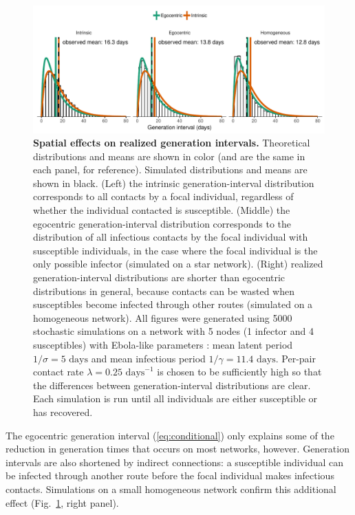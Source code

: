 \documentclass[12pt]{article}
\newcommand{\eref}[1]{(\ref{eq:#1})}
\newcommand{\fref}[1]{Fig.~\ref{fig:#1}}
\begin{document}
\begin{figure}[!pbth]
\includegraphics[width=\textwidth]{../fig/local_effect.pdf}
\caption{
\textbf{Spatial effects on realized generation intervals.}
Theoretical distributions and means are shown in color (and are the same in each panel, for reference). Simulated distributions and means are shown in black.
(Left) the intrinsic generation-interval distribution corresponds to all contacts by a focal individual, regardless of whether the individual contacted is susceptible.
(Middle) the egocentric generation-interval distribution corresponds to the distribution of all infectious contacts by the focal individual with susceptible individuals, in the case where the focal individual is the only possible infector (simulated on a star network).
(Right) realized generation-interval distributions are shorter than egocentric distributions in general, because contacts can be wasted when susceptibles become infected through other routes (simulated on a homogeneous network).
All figures were generated using 5000 stochastic simulations on a network with 5 nodes (1 infector and 4 susceptibles) with Ebola-like parameters \citep{who2014ebola}:
mean latent period $1/\sigma = 5 \textrm{ days}$ and mean infectious period $1/\gamma = 11.4 \textrm{ days}$. 
Per-pair contact rate $\lambda = 0.25 \textrm{ days}^{-1}$ is chosen to be sufficiently high so that the differences between generation-interval distributions are clear.
Each simulation is run until all individuals are either susceptible or has recovered.
}
\label{fig:local}
\end{figure}

The egocentric generation interval \eref{conditional} only explains some of the reduction in generation times that occurs on most networks, however.
Generation intervals are also shortened by indirect connections: a susceptible individual can be infected through another route before the focal individual makes infectious contacts.
Simulations on a small homogeneous network confirm this additional effect (\fref{local}, right panel). 
\end{document}

